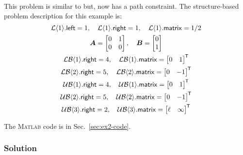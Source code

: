 \noindent This problem is similar to  but, now has a path constraint.
The structure-based problem description for this example is:%
\allowdisplaybreaks[1]
\begin{subequations}%
\begin{gather}
\mathcal{L}\xind{1}.\xvar{left} = 1, \quad \mathcal{L}\xind{1}.\xvar{right} = 1, \quad \mathcal{L}\xind{1}.\xvar{matrix} = 1/2 \\
\bm{A} = \begin{bmatrix} 0 & 1 \\ 0 & 0
\end{bmatrix}, \quad \bm{B} = \begin{bmatrix} 0 \\ 1
\end{bmatrix} \\
\mathcal{LB}\xind{1}.\xvar{right} = 4, \quad \mathcal{LB}\xind{1}.\xvar{matrix} = \begin{bmatrix} 0 & 1 \end{bmatrix}\tran \\
\mathcal{LB}\xind{2}.\xvar{right} = 5, \quad \mathcal{LB}\xind{2}.\xvar{matrix} = \begin{bmatrix} 0 & -1 \end{bmatrix}\tran \\
\mathcal{UB}\xind{1}.\xvar{right} = 4, \quad \mathcal{UB}\xind{1}.\xvar{matrix} = \begin{bmatrix} 0 & 1 \end{bmatrix}\tran \\
\mathcal{UB}\xind{2}.\xvar{right} = 5, \quad \mathcal{UB}\xind{2}.\xvar{matrix} = \begin{bmatrix} 0 & -1 \end{bmatrix}\tran \\
\mathcal{UB}\xind{3}.\xvar{right} = 2, \quad \mathcal{UB}\xind{3}.\xvar{matrix} = \begin{bmatrix}\ell & \infty \end{bmatrix}\tran %
\end{gather}
\end{subequations}%
\allowdisplaybreaks[0]%

\noindent The \textsc{Matlab} code is in Sec.~\ref{sec:ex2-code}.

\subsubsection{Solution}

